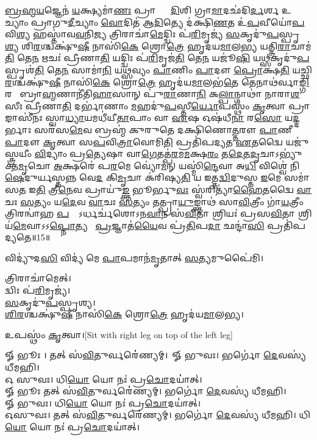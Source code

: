 {\ul{𑌬𑍍𑌰}\ul{𑌹𑍍𑌮}\ul{𑌯}𑌜𑍍𑌞𑍇𑌨॑ \ul{𑌯}𑌕𑍍𑌷𑍍𑌯𑌮𑌾॑\ul{𑌣𑌃} 𑌪𑍍𑌰𑌾𑌚𑍍𑌯𑌾𑌂᳚ \ul{𑌦𑌿}𑌶𑌿 𑌗𑍍𑌰𑌾\ul{𑌮𑌾}𑌦𑌛॑𑌦𑌿\ul{𑌰𑍍𑌦}𑌰𑍍\mbox{}𑌶 𑌉𑌦𑍀᳚𑌚𑍍𑌯𑌾𑌂 𑌪𑍍𑌰𑌾𑌗𑍁\ul{𑌦𑍀}𑌚𑍍𑌯𑌾𑌂 \ul{𑌵𑍋}𑌦𑌿𑌤॑ 𑌆\ul{𑌦𑌿}𑌤𑍍𑌯𑍇 𑌦॑𑌕𑍍𑌷𑌿\ul{𑌣}𑌤 𑌉॑\ul{𑌪}𑌵𑍀𑌯𑍋॑\ul{𑌪}𑌵𑌿\ul{𑌶𑍍𑌯} 𑌹𑌸𑍍𑌤𑌾॑𑌵\ul{𑌵}𑌨𑌿\ul{𑌜𑍍𑌯} 𑌤𑍍𑌰𑌿𑌰𑌾𑌚𑌾॑\ul{𑌮𑍇}𑌦𑍍𑌦𑍍𑌵𑌿𑌃 𑌪॑\ul{𑌰𑌿}𑌮𑍃𑌜𑍍𑌯॑ \ul{𑌸}𑌕𑍃𑌦𑍁॑\ul{𑌪}𑌸𑍍𑌪𑍃\ul{𑌶𑍍𑌯} 𑌶𑌿\ul{𑌰}𑌶𑍍𑌚𑌕𑍍𑌷𑍁॑\ul{𑌷𑍀} 𑌨𑌾𑌸𑌿॑\ul{𑌕𑍇} 𑌶𑍍𑌰𑍋\ul{𑌤𑍍𑌰𑍇} 𑌹𑍃𑌦॑𑌯\ul{𑌮𑌾}𑌲\ul{𑌭𑍍𑌯} 𑌯𑌤𑍍𑌤𑍍𑌰𑌿\ul{𑌰𑌾}𑌚𑌾𑌮॑\ul{𑌤𑌿} 𑌤𑍇\ul{𑌨} 𑌋𑌚𑌃॑ 𑌪𑍍𑌰𑍀𑌣𑌾\ul{𑌤𑌿} 𑌯𑌦𑍍𑌦𑍍𑌵𑌿𑌃 𑌪॑\ul{𑌰𑌿}𑌮𑍃𑌜॑\ul{𑌤𑌿} 𑌤𑍇\ul{𑌨} 𑌯𑌜𑍂॑\ul{𑌷𑌿} 𑌯\ul{𑌥𑍍𑌸}𑌕𑍃𑌦𑍁॑\ul{𑌪}𑌸𑍍𑌪𑍃𑌶॑\ul{𑌤𑌿} 𑌤𑍇\ul{𑌨} 𑌸𑌾𑌮𑌾॑\ul{𑌨𑌿} 𑌯\ul{𑌥𑍍𑌸}𑌵𑍍𑌯𑌂 \ul{𑌪𑌾}𑌣𑌿𑌂 \ul{𑌪𑌾}𑌦𑍗 \ul{𑌪𑍍𑌰𑍋}𑌕𑍍𑌷\ul{𑌤𑌿} 𑌯𑌚𑍍𑌛𑌿\ul{𑌰}𑌶𑍍𑌚𑌕𑍍𑌷𑍁॑\ul{𑌷𑍀} 𑌨𑌾𑌸𑌿॑\ul{𑌕𑍇} 𑌶𑍍𑌰𑍋\ul{𑌤𑍍𑌰𑍇} 𑌹𑍃𑌦॑𑌯\ul{𑌮𑌾}𑌲𑌭॑\ul{𑌤𑍇} 𑌤𑍇𑌨𑌾𑌥॑𑌰𑍍𑌵𑌾\ul{𑌙𑍍𑌗𑌿}𑌰𑌸𑍋᳚ 𑌬𑍍𑌰𑌾\ul{𑌹𑍍𑌮}𑌣𑌾𑌨𑍀॑𑌤𑌿\ul{𑌹𑌾}𑌸𑌾𑌨𑍍 𑌪𑍁॑\ul{𑌰𑌾}𑌣𑌾\ul{𑌨𑌿} 𑌕\ul{𑌲𑍍𑌪𑌾}𑌨𑍍𑌗𑌾𑌥𑌾॑ 𑌨𑌾𑌰𑌾\ul{𑌶}\ul{}𑌸𑍀𑌃 𑌪𑍍𑌰𑍀॑𑌣𑌾\ul{𑌤𑌿} 𑌦𑌰𑍍𑌭𑌾॑𑌣𑌾𑌂 \ul{𑌮}𑌹𑌦𑍁॑\ul{𑌪}𑌸𑍍𑌤𑍀\ul{𑌰𑍍𑌯𑍋}𑌪𑌸𑍍𑌥𑌂॑ \ul{𑌕𑍃}𑌤𑍍𑌵𑌾 𑌪𑍍𑌰𑌾𑌙𑌾𑌸𑍀॑𑌨𑌃 𑌸𑍍𑌵𑌾\ul{𑌧𑍍𑌯𑌾}𑌯𑌮𑌧𑍀॑𑌯𑍀\ul{𑌤𑌾}𑌪𑌾𑌂 𑌵𑌾 \ul{𑌏}𑌷 𑌓𑌷॑𑌧𑍀\ul{𑌨𑌾}\ul{} 𑌰\ul{𑌸𑍋} 𑌯\ul{𑌦𑍍𑌦}𑌰𑍍𑌭𑌾𑌃 𑌸𑌰॑𑌸\ul{𑌮𑍇}𑌵 𑌬𑍍𑌰𑌹𑍍𑌮॑ 𑌕𑍁𑌰𑍁𑌤𑍇 𑌦𑌕𑍍𑌷𑌿𑌣𑍋\ul{𑌤𑍍𑌤}𑌰𑍗 \ul{𑌪𑌾}𑌣𑍀 \ul{𑌪𑌾}𑌦𑍗 \ul{𑌕𑍃}𑌤𑍍𑌵𑌾 𑌸\ul{𑌪}𑌵𑌿\ul{𑌤𑍍𑌰𑌾}𑌵𑍋𑌮𑌿\ul{𑌤𑌿} 𑌪𑍍𑌰𑌤𑌿॑𑌪𑌦𑍍𑌯𑌤 \ul{𑌏}𑌤𑌦𑍍𑌵𑍈 𑌯𑌜𑍁॑𑌸𑍍𑌤𑍍𑌰𑌯𑍀𑌂 \ul{𑌵𑌿}𑌦𑍍𑌯𑌾𑌂 𑌪𑍍𑌰\ul{𑌤𑍍𑌯𑍇}𑌷𑌾 𑌵𑌾\ul{𑌗𑍇}𑌤𑌤𑍍𑌪॑\ul{𑌰}𑌮\ul{𑌮}𑌕𑍍𑌷\ul{𑌰𑌂} 𑌤\ul{𑌦𑍇}𑌤\ul{𑌦𑍃}𑌚𑌾𑌽𑌭𑍍𑌯𑍁॑𑌕𑍍𑌤\ul{𑌮𑍃}𑌚𑍋 \ul{𑌅}𑌕𑍍𑌷𑌰𑍇॑ 𑌪\ul{𑌰}𑌮𑍇 𑌵𑍍𑌯𑍋॑\ul{𑌮}𑌨𑍍 𑌯𑌸𑍍𑌮𑌿॑\ul{𑌨𑍍𑌦𑍇}𑌵𑌾 𑌅\ul{𑌧𑌿} 𑌵𑌿𑌶𑍍𑌵𑍇॑ 𑌨𑌿\ul{𑌷𑍇}𑌦𑍁𑌰𑍍𑌯𑌸𑍍𑌤𑌨𑍍𑌨 𑌵𑍇\ul{𑌦} 𑌕𑌿\ul{𑌮𑍃}𑌚𑌾 𑌕॑𑌰𑌿𑌷𑍍𑌯\ul{𑌤𑌿} 𑌯 𑌇𑌤𑍍𑌤\ul{𑌦𑍍𑌵𑌿}𑌦𑍁𑌸𑍍𑌤 \ul{𑌇}𑌮𑍇 𑌸𑌮𑌾॑𑌸\ul{𑌤} 𑌇\ul{𑌤𑌿} 𑌤𑍍𑌰𑍀\ul{𑌨𑍇}𑌵 𑌪𑍍𑌰𑌾𑌯𑍁॑\ul{𑌙𑍍𑌕𑍍𑌤} 𑌭𑍂𑌰𑍍𑌭𑍁\ul{𑌵𑌃} 𑌸𑍍𑌵॑𑌰𑌿𑌤𑍍𑌯𑌾॑\ul{𑌹𑍈}𑌤𑌦𑍍𑌵𑍈 \ul{𑌵𑌾}𑌚𑌃 \ul{𑌸}𑌤𑍍𑌯𑌂 𑌯\ul{𑌦𑍇}𑌵 \ul{𑌵𑌾}𑌚𑌃 \ul{𑌸}𑌤𑍍𑌯𑌂 𑌤𑌤𑍍𑌪𑍍𑌰𑌾\ul{𑌯𑍁}𑌙𑍍𑌕𑍍𑌤𑌾𑌥॑ 𑌸𑌾\ul{𑌵𑌿}𑌤𑍍𑌰𑍀𑌂 𑌗𑌾॑\ul{𑌯}𑌤𑍍𑌰𑍀𑌂 𑌤𑍍𑌰𑌿𑌰𑌨𑍍𑌵𑌾॑𑌹 \ul{𑌪}𑌚𑍍𑌛𑍋᳚𑌽𑌰𑍍𑌧𑌰𑍍𑌚॑𑌶𑍋𑌽𑌨\ul{𑌵𑌾}𑌨 𑌸॑\ul{𑌵𑌿}𑌤𑌾 𑌶𑍍𑌰𑌿𑌯𑌃॑ 𑌪𑍍𑌰𑌸\ul{𑌵𑌿}𑌤𑌾 𑌶𑍍𑌰𑌿𑌯॑\ul{𑌮𑍇}𑌵𑌾𑌽𑌽\ul{𑌪𑍍𑌨𑍋}𑌤𑍍𑌯𑌥𑍋᳚ \ul{𑌪𑍍𑌰}𑌜𑍍𑌞𑌾𑌤॑\ul{𑌯𑍈}𑌵 𑌪𑍍𑌰॑\ul{𑌤𑌿}𑌪\ul{𑌦𑌾} 𑌛𑌨𑍍𑌦𑌾॑\ul{𑌸𑌿} 𑌪𑍍𑌰𑌤𑌿॑𑌪𑌦𑍍𑌯𑌤𑍇॥15॥


}

𑌵𑌿𑌦𑍍𑌯𑍁॑𑌦\ul{𑌸𑌿} 𑌵𑌿𑌦𑍍𑌯॑ 𑌮𑍇 \ul{𑌪𑌾}𑌪𑌮𑌾𑌨॑\ul{𑌮𑍃}𑌤𑌾𑌤𑍍 \ul{𑌸}𑌤𑍍𑌯𑌮𑍁𑌪𑍈॑𑌮𑌿।

𑌤𑍍𑌰𑌿𑌰𑌾𑌚𑌾॑𑌮𑍇𑌤𑍍।\\
𑌦𑍍𑌵𑌿𑌃 𑌪॑\ul{𑌰𑌿}𑌮𑍃𑌜𑍍𑌯॑।\\
\ul{𑌸}𑌕𑍃𑌦𑍁॑\ul{𑌪}𑌸𑍍𑌪𑍃𑌶𑍍𑌯।\\
\ul{𑌶𑌿}\ul{𑌰}𑌶𑍍𑌚𑌕𑍍𑌷𑍁॑\ul{𑌷𑍀} 𑌨𑌾𑌸𑌿॑\ul{𑌕𑍇} 𑌶𑍍𑌰𑍋\ul{𑌤𑍍𑌰𑍇} 𑌹𑍃𑌦॑𑌯\ul{𑌮𑌾}𑌲𑌭𑍍𑌯।

𑌉𑌪𑌸𑍍𑌥𑌂॑ \ul{𑌕𑍃}𑌤𑍍𑌵𑌾।{\scriptsize [Sit with right leg on top of the left leg]}

𑍐 𑌭𑍂𑌃 । 𑌤𑌤𑍍 𑌸॑\ul{𑌵𑌿}𑌤𑍁𑌰𑍍𑌵𑌰𑍇॑॑𑌣𑍍𑌯𑌮𑍍।\
𑍐 𑌭𑍁𑌵𑌃। 𑌭𑌰𑍍𑌗𑍋॑ \ul{𑌦𑍇}𑌵𑌸𑍍𑌯॑ 𑌧𑍀𑌮𑌹𑌿।\\
𑌓 𑌸𑍁𑌵𑌃। 𑌧𑌿\ul{𑌯𑍋} 𑌯𑍋 𑌨𑌃॑ 𑌪𑍍𑌰\ul{𑌚𑍋}𑌦𑌯𑌾॑॑𑌤𑍍।\\
𑍐 𑌭𑍂𑌃 𑌤𑌤𑍍 𑌸॑\ul{𑌵𑌿}𑌤𑍁𑌰𑍍𑌵𑌰𑍇॑॑𑌣𑍍𑌯𑌮𑍍। 𑌭𑌰𑍍𑌗𑍋॑ \ul{𑌦𑍇}𑌵𑌸𑍍𑌯॑ 𑌧𑍀𑌮𑌹𑌿।\\
𑍐 𑌭𑍁𑌵𑌃। 𑌧𑌿\ul{𑌯𑍋} 𑌯𑍋 𑌨𑌃॑ 𑌪𑍍𑌰\ul{𑌚𑍋}𑌦𑌯𑌾॑॑𑌤𑍍।\\
𑌓𑌸𑍁𑌵𑌃। 𑌤𑌤𑍍 𑌸॑\ul{𑌵𑌿}𑌤𑍁𑌰𑍍𑌵𑌰𑍇॑॑𑌣𑍍𑌯𑌮𑍍। 𑌭𑌰𑍍𑌗𑍋॑ \ul{𑌦𑍇}𑌵𑌸𑍍𑌯॑ 𑌧𑍀𑌮𑌹𑌿। 𑌧𑌿\ul{𑌯𑍋} 𑌯𑍋 𑌨𑌃॑ 𑌪𑍍𑌰\ul{𑌚𑍋}𑌦𑌯𑌾॑॑𑌤𑍍।\\

